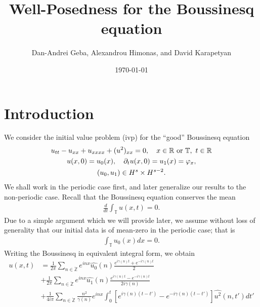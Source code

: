 \documentclass[12pt,reqno]{amsart}
\numberwithin{equation}{section}  %
\newcommand{\rr}{\mathbb{R}}
\newcommand{\zz}{\mathbb{Z}}
\newcommand{\ci}{\mathbb{T}}
\newcommand{\zzdot}{\dot{\zz}}
\newcommand{\wh}{\widehat}
\newcommand{\p}{\partial}
\newcommand{\vp}{\varphi}
\begin{document}
\title{Well-Posedness for the Boussinesq equation}
\author{Dan-Andrei Geba, Alexandrou Himonas, and David Karapetyan}
\address{Department of Mathematics, University of Rochester, Rochester, NY 14627}
\address{Department of Mathematics, University of Notre Dame, Notre Dame, IN 46556}
\address{Department of Mathematics, University of Notre Dame, Notre Dame, IN 46556}
\date{\today}
\maketitle
\tableofcontents
\section{Introduction}
We consider the initial value problem (ivp) for the ``good'' Boussinesq
equation 
\begin{gather}
u_{tt} -u_{xx} + u_{xxxx} + (u^2)_{xx} = 0, \quad x \in \rr \ \text{or} \
\ci, \ t \in \rr
\label{eqn:mb-2}
\\
u(x,0) = u_{0}(x), \quad \p_t u(x, 0) = u_{1}(x)= \vp_{x}, 
\label{eqn:mb-init-data-2}
\\
\notag
(u_0, u_1) \in
H^{s}\times
H^{s-2}.
\end{gather}
We shall work in the periodic case first, and later generalize our results to
the non-periodic case. Recall that the Boussinesq equation conserves the mean
\begin{equation*}
\begin{split}
\frac{d}{dt} \int_{\ci} u(x,t) = 0.
\end{split}
\end{equation*}
Due to a simple argument which we will provide later, we assume without loss of generality that our initial data is of mean-zero in the periodic case; that is 
\begin{equation*}
\begin{split}
\int_{\ci} u_{0}(x) dx = 0.
\end{split}
\end{equation*}
Writing the Boussinesq in equivalent integral form, we obtain 
\begin{equation}
\begin{split}
u(x,t)
& = \frac{1}{2\pi}\sum_{n \in \zzdot} e^{inx} \wh{u_{0}}(n) \frac{e^{i\gamma(n)t} + e^{-i\gamma(n)t}}{2} 
\\
& + \frac{1}{2 \pi}\sum_{n \in \zzdot} e^{inx}
\wh{u_{1}}(n)\frac{e^{i\gamma(n)t} - e^{-i\gamma(n)t}}{2 i \gamma(n)} 
\\
& + \frac{1}{4 i \pi}\sum_{n \in \zzdot} \frac{n^{2}}{\gamma(n)} e^{inx}
\int_{0}^{t}[e^{i\gamma(n)(t-t')}-e^{-i\gamma(n)(t-t')}]
\wh{u^{2}}(n, t') dt'
\end{split}
\label{eqn:integral-form}
\end{equation}
\end{document}
